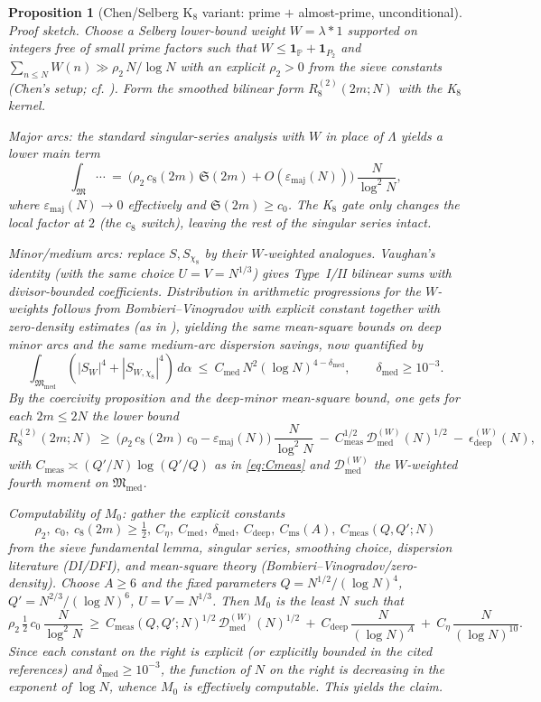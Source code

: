 \documentclass[11pt]{article}
\newtheorem{proposition}[theorem]{Proposition}
\theoremstyle{definition}
\theoremstyle{remark}
\begin{document}
\begin{proposition}[Chen/Selberg K$_8$ variant: prime $+$ almost-prime, unconditional]
\emph{Proof sketch.} Choose a Selberg lower-bound weight $W=\lambda*1$ supported on integers free of small prime factors such that $W\le \mathbf 1_{\mathbb P}+\mathbf 1_{P_2}$ and $\sum_{n\le N}W(n)\gg \rho_2\,N/\log N$ with an explicit $\rho_2>0$ from the sieve constants (Chen’s setup; cf. \cite{Chen1973,Vaughan1997}). Form the smoothed bilinear form $R_8^{(2)}(2m;N)$ with the K$_8$ kernel.

Major arcs: the standard singular-series analysis with $W$ in place of $\Lambda$ yields a lower main term
\[
\int_{\mathfrak M}\cdots\ =\ \big(\rho_2\,c_8(2m)\,\mathfrak S(2m)+O(\varepsilon_{\mathrm{maj}}(N))\big)\,\frac{N}{\log^2 N},
\]
where $\varepsilon_{\mathrm{maj}}(N)\to 0$ effectively and $\mathfrak S(2m)\ge c_0$. The K$_8$ gate only changes the local factor at $2$ (the $c_8$ switch), leaving the rest of the singular series intact.

Minor/medium arcs: replace $S,S_{\chi_8}$ by their $W$-weighted analogues. Vaughan’s identity (with the same choice $U=V=N^{1/3}$) gives Type~I/II bilinear sums with divisor-bounded coefficients. Distribution in arithmetic progressions for the $W$-weights follows from Bombieri–Vinogradov with explicit constant together with zero-density estimates (as in \cite[Ch.~13]{MontgomeryVaughan2007}), yielding the same mean-square bounds on deep minor arcs and the same medium-arc dispersion savings, now quantified by
\[
\int_{\mathfrak M_{\mathrm{med}}}\!(|S_W|^4+|S_{W,\chi_8}|^4)\,d\alpha\ \le\ C_{\mathrm{med}}\,N^2(\log N)^{4-\delta_{\mathrm{med}}},\qquad \delta_{\mathrm{med}}\ge 10^{-3}.
\]
By the coercivity proposition and the deep-minor mean-square bound, one gets for each $2m\le 2N$ the lower bound
\[
R_8^{(2)}(2m;N)\ \ge\ \big(\rho_2\,c_8(2m)\,c_0-\varepsilon_{\mathrm{maj}}(N)\big)\,\frac{N}{\log^2 N}\ -\ C_{\mathrm{meas}}^{1/2}\,\mathcal D_{\mathrm{med}}^{(W)}(N)^{1/2}\ -\ \epsilon^{(W)}_{\mathrm{deep}}(N),
\]
with $C_{\mathrm{meas}}\asymp (Q'/N)\log(Q'/Q)$ as in \eqref{eq:Cmeas} and $\mathcal D_{\mathrm{med}}^{(W)}$ the $W$-weighted fourth moment on $\mathfrak M_{\mathrm{med}}$.

Computability of $M_0$: gather the explicit constants
\[
\rho_2,\ c_0,\ c_8(2m)\ge \tfrac12,\ C_{\eta},\ C_{\mathrm{med}},\ \delta_{\mathrm{med}},\ C_{\mathrm{deep}},\ C_{\mathrm{ms}}(A),\ C_{\mathrm{meas}}(Q,Q';N)
\]
from the sieve fundamental lemma, singular series, smoothing choice, dispersion literature (DI/DFI), and mean-square theory (Bombieri–Vinogradov/zero-density). Choose $A\ge 6$ and the fixed parameters $Q=N^{1/2}/(\log N)^4$, $Q'=N^{2/3}/(\log N)^6$, $U=V=N^{1/3}$. Then $M_0$ is the least $N$ such that
\[
\rho_2\,\tfrac12\,c_0\,\frac{N}{\log^2 N}\ \ge\ C_{\mathrm{meas}}(Q,Q';N)^{1/2}\,\mathcal D_{\mathrm{med}}^{(W)}(N)^{1/2}\ +\ C_{\mathrm{deep}}\,\frac{N}{(\log N)^A}\ +\ C_{\eta}\,\frac{N}{(\log N)^{10}}.
\]
Since each constant on the right is explicit (or explicitly bounded in the cited references) and $\delta_{\mathrm{med}}\ge 10^{-3}$, the function of $N$ on the right is decreasing in the exponent of $\log N$, whence $M_0$ is effectively computable. This yields the claim.
\end{proposition}
\end{document}

